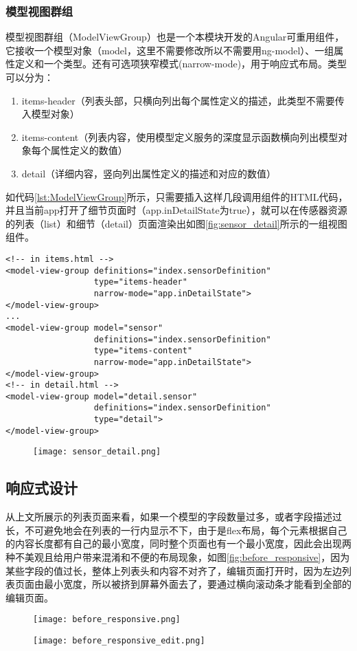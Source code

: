 \subsubsection{模型视图群组}
模型视图群组（ModelViewGroup）也是一个本模块开发的Angular可重用组件，它接收一个模型对象（model，这里不需要修改所以不需要用ng-model）、一组属性定义和一个类型。还有可选项狭窄模式(narrow-mode)，用于响应式布局。类型可以分为：
\begin{enumerate}
  \item items-header（列表头部，只横向列出每个属性定义的描述，此类型不需要传入模型对象）
  \item items-content（列表内容，使用模型定义服务的深度显示函数横向列出模型对象每个属性定义的数值）
  \item detail（详细内容，竖向列出属性定义的描述和对应的数值）
\end{enumerate}
如代码\ref{lst:ModelViewGroup}所示，只需要插入这样几段调用组件的HTML代码，并且当前app打开了细节页面时（app.inDetailState为true），就可以在传感器资源的列表（list）和细节（detail）页面渲染出如图\ref{fig:sensor_detail}所示的一组视图组件。
\begin{lstlisting}[language={HTML5}, label={lst:ModelViewGroup}, caption={传感器列表页面中的模型输入群组代码}]
<!-- in items.html -->
<model-view-group definitions="index.sensorDefinition"
                  type="items-header"
                  narrow-mode="app.inDetailState">
</model-view-group>
...
<model-view-group model="sensor"
                  definitions="index.sensorDefinition"
                  type="items-content"
                  narrow-mode="app.inDetailState">
</model-view-group>
<!-- in detail.html -->
<model-view-group model="detail.sensor"
                  definitions="index.sensorDefinition"
                  type="detail">
</model-view-group>
\end{lstlisting}
\begin{figure}[!htp]
 \centering
 \texttt{[image: sensor\_detail.png]}
\end{figure}
\subsection{响应式设计}
从上文所展示的列表页面来看，如果一个模型的字段数量过多，或者字段描述过长，不可避免地会在列表的一行内显示不下，由于是flex布局，每个元素根据自己的内容长度都有自己的最小宽度，同时整个页面也有一个最小宽度，因此会出现两种不美观且给用户带来混淆和不便的布局现象，如图\ref{fig:before_responsive}，因为某些字段的值过长，整体上列表头和内容不对齐了，编辑页面打开时，因为左边列表页面由最小宽度，所以被挤到屏幕外面去了，要通过横向滚动条才能看到全部的编辑页面。
\begin{figure}[!htp]
 \centering
 \texttt{[image: before\_responsive.png]}

 \vspace{0.5cm}

 \texttt{[image: before\_responsive\_edit.png]}
\end{figure}

